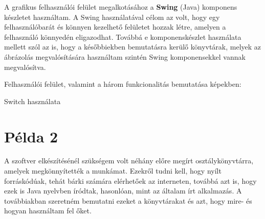 A grafikus felhasználói felület megalkotásához a \textbf{Swing} (Java) komponens készletet használtam. A Swing használatával célom az volt, hogy egy felhasználóbarát és könnyen kezelhető felületet hozzak létre, amelyen a felhasználó könnyedén eligazodhat. Továbbá e komponenskészlet használata mellett szól az is, hogy a későbbiekben bemutatásra kerülő könyvtárak, melyek az ábrázolás megvalósítására használtam szintén Swing komponensekkel vannak megvalósítva.

Felhasználói felület, valamint a három funkcionalitás bemutatása képekben:

\begin{algorithm}[H]
\caption{Switch haszn\'alata}
\end{algorithm}

\section {P\'elda 2}

	A szoftver elkészítésénél szükségem volt néhány előre megírt osztálykönyvtárra, amelyek megkönnyítették a munkámat. Ezekről tudni kell, hogy nyílt forráskódúak, tehát bárki számára elérhetőek az interneten, továbbá azt is, hogy ezek is Java nyelvben íródtak, hasonlóan, mint az általam írt alkalmazás. A továbbiakban szeretném bemutatni ezeket a könyvtárakat  és azt, hogy mire- és hogyan használtam fel őket.
	

